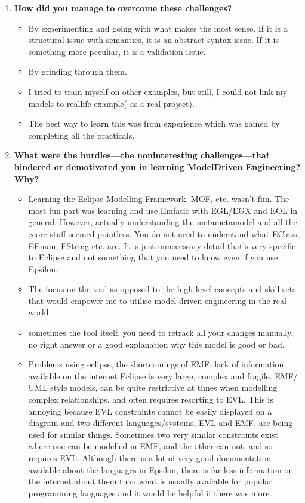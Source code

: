 \documentclass[12pt, a4paper]{report}
\begin{document}
\begin{appendices}
\begin{enumerate}
\item \textbf{How did you manage to overcome these challenges?}
\begin{itemize}
\item By experimenting and going with what makes the most sense. If it is a structural issue with semantics, it is an abstract syntax issue. If it is something more peculiar, it is a validation issue.
\item By grinding through them.
\item I tried to train myself on other examples, but still, I could not link my models to real­life example( as a real project). 
\item The best way to learn this was from experience which was gained by completing all the practicals.
\end{itemize}


\item \textbf{ What were the hurdles---the non­interesting challenges---that hindered or demotivated you in learning Model­Driven Engineering? Why?}
\begin{itemize}
\item Learning the Eclipse Modelling Framework, MOF, etc. wasn't fun. The most fun part was learning and use Emfatic with EGL/EGX and EOL in general. However, actually understanding the meta­metamodel and all the ecore stuff seemed pointless. You do not need to understand what EClass, EEnum, EString etc. are. It is just unnecessary detail that's very specific to
Eclipse and not something that you need to know even if you use Epsilon.
\item The focus on the tool as opposed to the high-level concepts and skill sets that would empower me to utilise model-driven engineering in the real world.
\item sometimes the tool itself, you need to re­track all your changes manually, no right answer or a good explanation why this model is good or bad.
\item Problems using eclipse, the shortcomings of EMF, lack of information available on the internet Eclipse is very large, complex and fragile. EMF/ UML ­style models, can be quite restrictive at times when modelling complex relationships, and often requires resorting to EVL. This is annoying because EVL constraints cannot be easily displayed on a diagram and two different languages/systems, EVL and EMF, are being used for similar things. Sometimes two very similar constraints exist where one can be modelled in EMF, and the other can not, and so requires EVL. Although there is a lot of very good documentation available about the languages in Epsilon, there is far less information on the internet about them than what is usually available for popular programming languages and it would be helpful if there was more.
\end{itemize}


\end{enumerate}
\end{appendices}
\end{document}
